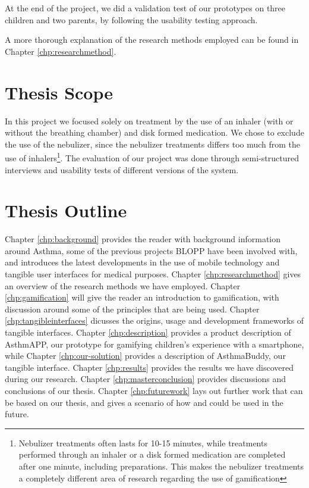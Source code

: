 At the end of the project, we did a validation test of our prototypes on three children and two parents, by following the usability testing approach. 

A more thorough explanation of the research methods employed can be found in Chapter \ref{chp:researchmethod}. 


\section{Thesis Scope}
\label{sec:thesis scope}
In this project we focused solely on treatment by the use of an inhaler (with or without the breathing chamber) and disk formed medication. We chose to exclude the use of the nebulizer, since the nebulizer treatments differs too much from the use of inhalers\footnote{Nebulizer treatments often lasts for 10-15 minutes, while treatments performed through an inhaler or a disk formed medication are completed after one minute, including preparations. This makes the nebulizer treatments a completely different area of research regarding the use of gamification}.
The evaluation of our project was done through semi-structured interviews and usability tests of different versions of the system.


\section{Thesis Outline}
\label{sec:thesisoutline}
Chapter \ref{chp:background} provides the reader with background information around Asthma, some of the previous projects BLOPP have been involved with, and introduces the latest developments in the use of mobile technology and tangible user interfaces for medical purposes.
Chapter \ref{chp:researchmethod} gives an overview of the research methods we have employed.  
Chapter \ref{chp:gamification} will give the reader an introduction to gamification, with discussion around some of the principles that are being used. 
Chapter \ref{chp:tangibleinterfaces} dicusses the origins, usage and development frameworks of tangible interfaces.
Chapter \ref{chp:description} provides a product description of AsthmAPP, our prototype for gamifying children's experience with a smartphone, while Chapter \ref{chp:our-solution} provides a description of AsthmaBuddy, our tangible interface.
Chapter \ref{chp:results} provides the results we have discovered during our research.
Chapter \ref{chp:masterconclusion} provides discussions and conclusions of our thesis.
Chapter \ref{chp:futurework} lays out further work that can be based on our thesis, and gives a scenario of how \ab{} and \app{} could be used in the future.            
